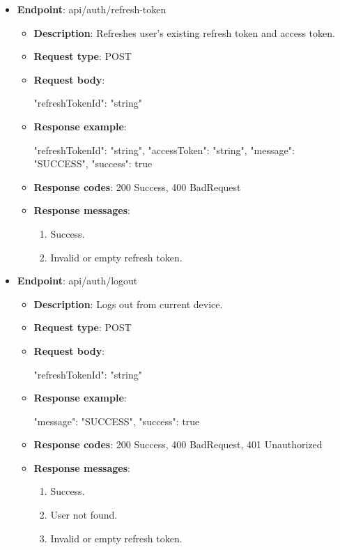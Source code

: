 \begin{itemize}
    \item \textbf{Endpoint}: api/auth/refresh-token
    \begin{itemize}
        \item \textbf{Description}: Refreshes user's existing refresh token and access token.
        \item \textbf{Request type}: POST
        \item \textbf{Request body}:
        \begin{spverbatim}
        {
            "refreshTokenId": "string"
        }
        \end{spverbatim}
        \item \textbf{Response example}:
        \begin{spverbatim}
        {
            "refreshTokenId": "string",
            "accessToken": "string",
            "message": "SUCCESS",
            "success": true
        }
        \end{spverbatim}
        \item \textbf{Response codes}: 200 Success, 400 BadRequest
        \item \textbf{Response messages}:
        \begin{enumerate}
            \item Success.
            \item Invalid or empty refresh token.
        \end{enumerate}
    \end{itemize}

    \item \textbf{Endpoint}: api/auth/logout
    \begin{itemize}
        \item \textbf{Description}: Logs out from current device.
        \item \textbf{Request type}: POST
        \item \textbf{Request body}:
        \begin{spverbatim}
        {
            "refreshTokenId": "string"
        }
        \end{spverbatim}
        \item \textbf{Response example}:
        \begin{spverbatim}
        {
            "message": "SUCCESS",
            "success": true
        }
        \end{spverbatim}
        \item \textbf{Response codes}: 200 Success, 400 BadRequest, 401 Unauthorized
        \item \textbf{Response messages}:
        \begin{enumerate}
            \item Success.
            \item User not found.
            \item Invalid or empty refresh token.
        \end{enumerate}
    \end{itemize}


\end{itemize}

